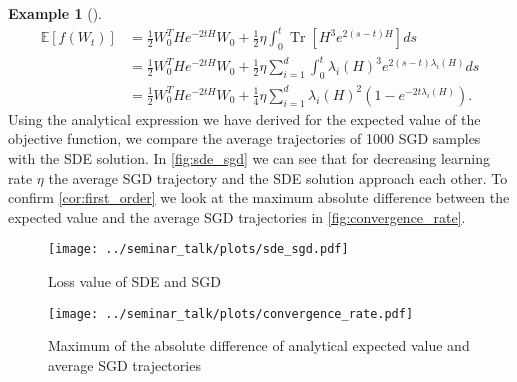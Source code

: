 \documentclass[12pt]{article}
\theoremstyle{definition}
\newtheorem{example}[example]{Example}
\numberwithin{equation}{section}
\newcommand{\ev}[1]{\mathbb{E}\left[{#1}\right]}
\DeclareMathOperator{\Tr}{Tr}
\begin{document}
\begin{example}[\autocite{liStochasticModifiedEquations2019}]
\begin{equation}
\begin{split}
    \ev{f(W_t)} &= \frac{1}{2}W_0^THe^{-2tH}W_0 + \frac{1}{2}\eta \int_0^t\Tr\left[H^3e^{2(s-t)H}\right]ds \\
    &= \frac{1}{2}W_0^THe^{-2tH}W_0 + \frac{1}{2}\eta \sum_{i=1}^d \int_0^t\lambda_i(H)^3e^{2(s-t)\lambda_i(H)}ds \\
    & = \frac{1}{2}W_0^THe^{-2tH}W_0 + \frac{1}{4}\eta \sum_{i=1}^d \lambda_i(H)^2\left(1 - e^{-2t\lambda_i(H)}\right).
  \end{split}
\end{equation}
Using the analytical expression we have derived for the expected value of the objective function, we compare the average trajectories of 1000 SGD samples with the SDE solution. In \autoref{fig:sde_sgd} we can see that for decreasing learning rate $\eta$ the average SGD trajectory and the SDE solution approach each other.
To confirm \autoref{cor:first_order} we look at the maximum absolute difference between the expected value and the average SGD trajectories in \autoref{fig:convergence_rate}.

\begin{figure}
  \centering
  \texttt{[image: ../seminar\_talk/plots/sde\_sgd.pdf]}
  \caption{Loss value of SDE and SGD}
  \label{fig:sde_sgd}
\end{figure}
\begin{figure}
  \centering
  \texttt{[image: ../seminar\_talk/plots/convergence\_rate.pdf]}
  \caption{Maximum of the absolute difference of analytical expected value and average SGD trajectories}
  \label{fig:convergence_rate}
\end{figure}
\end{example}
\end{document}
